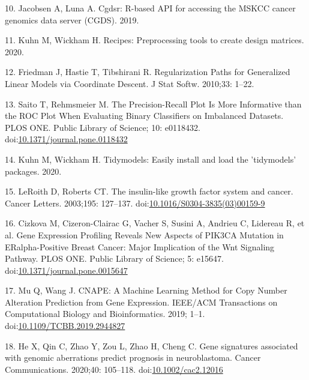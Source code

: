 \documentclass[10pt,letterpaper]{article}
\begin{document}
\leavevmode\hypertarget{ref-jacobsenCgdsrRbasedAPI2019}{}%
10. Jacobsen A, Luna A. Cgdsr: R-based API for accessing the MSKCC
cancer genomics data server (CGDS). 2019.

\leavevmode\hypertarget{ref-kuhnRecipesPreprocessingTools2020}{}%
11. Kuhn M, Wickham H. Recipes: Preprocessing tools to create design
matrices. 2020.

\leavevmode\hypertarget{ref-friedmanRegularizationPathsGeneralized2010}{}%
12. Friedman J, Hastie T, Tibshirani R. Regularization Paths for
Generalized Linear Models via Coordinate Descent. J Stat Softw. 2010;33:
1--22.

\leavevmode\hypertarget{ref-saitoPrecisionRecallPlotMore2015}{}%
13. Saito T, Rehmsmeier M. The Precision-Recall Plot Is More Informative
than the ROC Plot When Evaluating Binary Classifiers on Imbalanced
Datasets. PLOS ONE. Public Library of Science; 10: e0118432.
doi:\href{https://doi.org/10.1371/journal.pone.0118432}{10.1371/journal.pone.0118432}

\leavevmode\hypertarget{ref-kuhnTidymodelsEasilyInstall2020}{}%
14. Kuhn M, Wickham H. Tidymodels: Easily install and load the
'tidymodels' packages. 2020.

\leavevmode\hypertarget{ref-leroithInsulinlikeGrowthFactor2003}{}%
15. LeRoith D, Roberts CT. The insulin-like growth factor system and
cancer. Cancer Letters. 2003;195: 127--137.
doi:\href{https://doi.org/10.1016/S0304-3835(03)00159-9}{10.1016/S0304-3835(03)00159-9}

\leavevmode\hypertarget{ref-cizkovaGeneExpressionProfiling2010}{}%
16. Cizkova M, Cizeron-Clairac G, Vacher S, Susini A, Andrieu C,
Lidereau R, et al. Gene Expression Profiling Reveals New Aspects of
PIK3CA Mutation in ERalpha-Positive Breast Cancer: Major Implication of
the Wnt Signaling Pathway. PLOS ONE. Public Library of Science; 5:
e15647.
doi:\href{https://doi.org/10.1371/journal.pone.0015647}{10.1371/journal.pone.0015647}

\leavevmode\hypertarget{ref-muCNAPEMachineLearning2019}{}%
17. Mu Q, Wang J. CNAPE: A Machine Learning Method for Copy Number
Alteration Prediction from Gene Expression. IEEE/ACM Transactions on
Computational Biology and Bioinformatics. 2019; 1--1.
doi:\href{https://doi.org/10.1109/TCBB.2019.2944827}{10.1109/TCBB.2019.2944827}

\leavevmode\hypertarget{ref-heGeneSignaturesAssociated2020}{}%
18. He X, Qin C, Zhao Y, Zou L, Zhao H, Cheng C. Gene signatures
associated with genomic aberrations predict prognosis in neuroblastoma.
Cancer Communications. 2020;40: 105--118.
doi:\href{https://doi.org/10.1002/cac2.12016}{10.1002/cac2.12016}

\nolinenumbers
\end{document}
